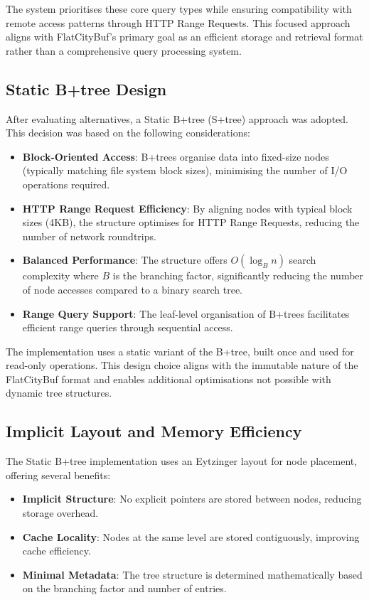 The system prioritises these core query types while ensuring compatibility with remote access patterns through HTTP Range Requests. This focused approach aligns with FlatCityBuf's primary goal as an efficient storage and retrieval format rather than a comprehensive query processing system.


\subsection{Static B+tree Design}
\label{methodology:attribute_index:static_btree_design}

After evaluating alternatives, a Static B+tree (S+tree) approach was adopted. This decision was based on the following considerations:

\begin{itemize}
    \item \textbf{Block-Oriented Access}: B+trees organise data into fixed-size nodes (typically matching file system block sizes), minimising the number of I/O operations required.
    \item \textbf{HTTP Range Request Efficiency}: By aligning nodes with typical block sizes (4KB), the structure optimises for HTTP Range Requests, reducing the number of network roundtrips.
    \item \textbf{Balanced Performance}: The structure offers $O(\log_B n)$ search complexity where $B$ is the branching factor, significantly reducing the number of node accesses compared to a binary search tree.
    \item \textbf{Range Query Support}: The leaf-level organisation of B+trees facilitates efficient range queries through sequential access.
\end{itemize}

The implementation uses a static variant of the B+tree, built once and used for read-only operations. This design choice aligns with the immutable nature of the FlatCityBuf format and enables additional optimisations not possible with dynamic tree structures.

\subsection{Implicit Layout and Memory Efficiency}
\label{methodology:attribute_index:implicit_layout}

The Static B+tree implementation uses an Eytzinger layout for node placement, offering several benefits:

\begin{itemize}
    \item \textbf{Implicit Structure}: No explicit pointers are stored between nodes, reducing storage overhead.
    \item \textbf{Cache Locality}: Nodes at the same level are stored contiguously, improving cache efficiency.
    \item \textbf{Minimal Metadata}: The tree structure is determined mathematically based on the branching factor and number of entries.
\end{itemize}

